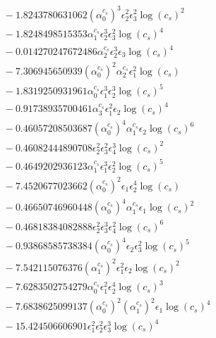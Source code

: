 \documentclass[10pt]{article}
\begin{document}
\begin{align*}
&{}  - 1.8243780631062 \left(\alpha_{0}^{c_s}\right)^{3} \epsilon_{2}^{2} \epsilon_{3}^{2} \log{\left(c_{s} \right)}^{2} \\
&{}  - 1.8248498515353 \alpha_{1}^{c_s} \epsilon_{2}^{3} \epsilon_{3}^{2} \log{\left(c_{s} \right)}^{4} \\
&{}  - 0.014270247672486 \alpha_{2}^{c_s} \epsilon_{2}^{3} \epsilon_{3} \log{\left(c_{s} \right)}^{4} \\
&{}  - 7.306945650939 \left(\alpha_{0}^{c_s}\right)^{2} \alpha_{2}^{c_s} \epsilon_{1}^{2} \log{\left(c_{s} \right)} \\
&{}  - 1.8319250931961 \alpha_{0}^{c_s} \epsilon_{1}^{3} \epsilon_{2}^{3} \log{\left(c_{s} \right)}^{5} \\
&{}  - 0.91738935700461 \alpha_{3}^{c_s} \epsilon_{1}^{2} \epsilon_{2} \log{\left(c_{s} \right)}^{4} \\
&{}  - 0.46057208503687 \left(\alpha_{0}^{c_s}\right)^{4} \alpha_{1}^{c_s} \epsilon_{2} \log{\left(c_{s} \right)}^{6} \\
&{}  - 0.46082444890708 \epsilon_{2}^{2} \epsilon_{3}^{2} \epsilon_{4}^{3} \log{\left(c_{s} \right)}^{2} \\
&{}  - 0.4649202936123 \alpha_{1}^{c_s} \epsilon_{1}^{3} \epsilon_{2}^{2} \log{\left(c_{s} \right)}^{5} \\
&{}  - 7.4520677023662 \left(\alpha_{0}^{c_s}\right)^{2} \epsilon_{1} \epsilon_{2}^{4} \log{\left(c_{s} \right)} \\
&{}  - 0.46650746960448 \left(\alpha_{0}^{c_s}\right)^{4} \alpha_{1}^{c_s} \epsilon_{1} \log{\left(c_{s} \right)}^{2} \\
&{}  - 0.46818384082888 \epsilon_{2}^{2} \epsilon_{3}^{3} \epsilon_{4}^{2} \log{\left(c_{s} \right)}^{6} \\
&{}  - 0.93868585738384 \left(\alpha_{0}^{c_s}\right)^{4} \epsilon_{2} \epsilon_{3}^{2} \log{\left(c_{s} \right)}^{5} \\
&{}  - 7.542115076376 \left(\alpha_{1}^{c_s}\right)^{2} \epsilon_{1}^{2} \epsilon_{2} \log{\left(c_{s} \right)}^{2} \\
&{}  - 7.6283502754279 \alpha_{0}^{c_s} \epsilon_{1}^{2} \epsilon_{2}^{4} \log{\left(c_{s} \right)}^{3} \\
&{}  - 7.6838625099137 \left(\alpha_{0}^{c_s}\right)^{2} \left(\alpha_{1}^{c_s}\right)^{2} \epsilon_{1} \log{\left(c_{s} \right)}^{4} \\
&{}  - 15.424506606901 \epsilon_{1}^{2} \epsilon_{2}^{2} \epsilon_{3}^{3} \log{\left(c_{s} \right)}^{4} \\

\end{align*}
\end{document}

